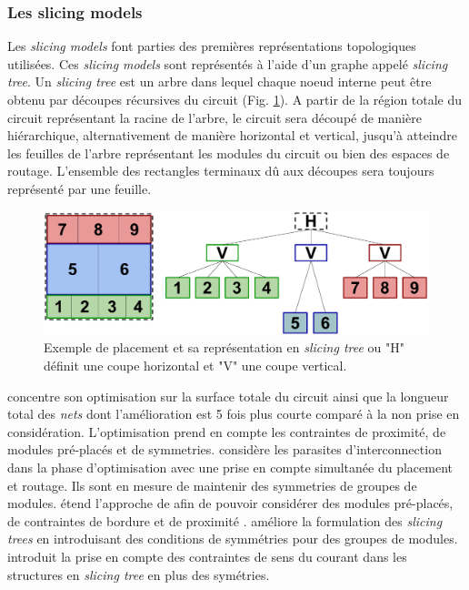 \subsubsection{Les slicing models}
Les {\it slicing models} \cite{Wong1986} font parties des premières représentations topologiques utilisées. Ces {\it slicing models} sont représentés à l'aide d'un graphe appelé {\it slicing tree}. Un {\it slicing tree} est un arbre dans lequel chaque noeud interne peut être obtenu par découpes récursives du circuit (Fig. \ref{fig:1}). A partir de la région totale du circuit représentant la racine de l'arbre, le circuit sera découpé de manière hiérarchique, alternativement de manière horizontal et vertical, jusqu'à atteindre les feuilles de l'arbre représentant les modules du circuit ou bien des espaces de routage. L'ensemble des rectangles terminaux dû aux découpes sera toujours représenté par une feuille. \newline
\begin{figure}[h]
\begin{center}
\includegraphics[height=0.17\textheight]{Figures/1.pdf}
\caption{Exemple de placement et sa représentation en {\it slicing tree} ou "H" définit une coupe horizontal et "V" une coupe vertical.} 
\label{fig:1}
\end{center}
\end{figure}  \newline
\cite{Abthoff1996} concentre son optimisation sur la surface totale du circuit ainsi que la longueur total des {\it nets} dont l'amélioration est 5 fois plus courte comparé à la non prise en considération. L'optimisation prend en compte les contraintes de proximité, de modules pré-placés et de symmetries. \cite{Prieto1997} considère les parasites d'interconnection dans la phase d'optimisation avec une prise en compte simultanée du placement et routage. Ils sont en mesure de maintenir des symmetries de groupes de modules. \cite{Young1998} étend l'approche de \cite{Wong1986} afin de pouvoir considérer des modules pré-placés, de contraintes de bordure \cite{Young1999} et de proximité \cite{Young2000}. \cite{lina2012} améliore la formulation des {\it slicing trees} en introduisant des conditions de symmétries pour des groupes de modules. \cite{Wu2012} introduit la prise en compte des contraintes de sens du courant dans les structures en {\it slicing tree} en plus des symétries. \newline

